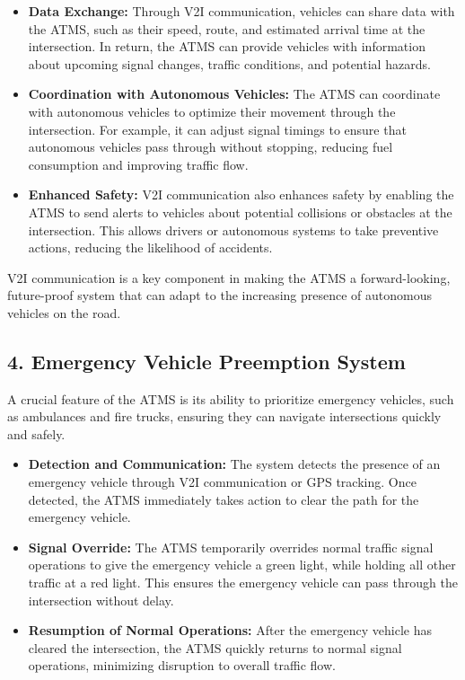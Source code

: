 \documentclass{scrreprt}
\begin{document}
\begin{itemize}
    \item \textbf{Data Exchange:} 
    Through V2I communication, vehicles can share data with the ATMS, such as their speed, route, and estimated arrival time at the intersection. In return, the ATMS can provide vehicles with information about upcoming signal changes, traffic conditions, and potential hazards.

    \item \textbf{Coordination with Autonomous Vehicles:} 
    The ATMS can coordinate with autonomous vehicles to optimize their movement through the intersection. For example, it can adjust signal timings to ensure that autonomous vehicles pass through without stopping, reducing fuel consumption and improving traffic flow.

    \item \textbf{Enhanced Safety:} 
    V2I communication also enhances safety by enabling the ATMS to send alerts to vehicles about potential collisions or obstacles at the intersection. This allows drivers or autonomous systems to take preventive actions, reducing the likelihood of accidents.
\end{itemize}

V2I communication is a key component in making the ATMS a forward-looking, future-proof system that can adapt to the increasing presence of autonomous vehicles on the road.

\subsection*{4. Emergency Vehicle Preemption System}

A crucial feature of the ATMS is its ability to prioritize emergency vehicles, such as ambulances and fire trucks, ensuring they can navigate intersections quickly and safely.

\begin{itemize}
    \item \textbf{Detection and Communication:} 
    The system detects the presence of an emergency vehicle through V2I communication or GPS tracking. Once detected, the ATMS immediately takes action to clear the path for the emergency vehicle.

    \item \textbf{Signal Override:} 
    The ATMS temporarily overrides normal traffic signal operations to give the emergency vehicle a green light, while holding all other traffic at a red light. This ensures the emergency vehicle can pass through the intersection without delay.

    \item \textbf{Resumption of Normal Operations:} 
    After the emergency vehicle has cleared the intersection, the ATMS quickly returns to normal signal operations, minimizing disruption to overall traffic flow.
\end{itemize}
\end{document}
